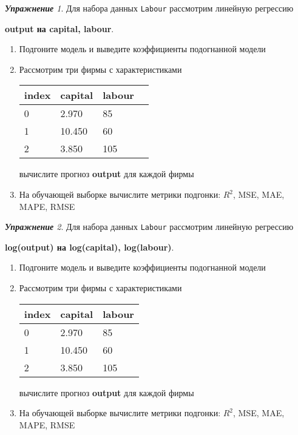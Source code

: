\documentclass[a4,12pt]{article}
\theoremstyle{remark}
\newtheorem{exercise}{\textbf{Упражнение}}[section]
\begin{document}
\begin{exercise}
Для набора данных \texttt{Labour} рассмотрим линейную регрессию 
\begin{center}
	\textbf{output на capital, labour}.
\end{center}
\begin{enumerate}
	\item Подгоните модель и выведите коэффициенты подогнанной модели
	\item Рассмотрим три фирмы с характеристиками
	\begin{center}
		\begin{tabular}{|l||l||l|l|}\hline
			index & capital & labour \\ \hline\hline
			0 & 2.970 & 85 \\
			1 & 10.450 & 60  \\
			2 & 3.850 & 105 \\ \hline
		\end{tabular}
	\end{center}
	вычислите прогноз \textbf{output} для каждой фирмы
	\item На обучающей выборке вычислите метрики подгонки: \(R^2\), 
	MSE, MAE, MAPE, RMSE
\end{enumerate}
\end{exercise}

\begin{exercise}
Для набора данных \texttt{Labour} рассмотрим линейную регрессию 
\begin{center}
	\textbf{log(output) на log(capital), log(labour)}.
\end{center}
\begin{enumerate}
	\item Подгоните модель и выведите коэффициенты подогнанной модели
	\item Рассмотрим три фирмы с характеристиками
	\begin{center}
		\begin{tabular}{|l||l|l|}\hline
			index & capital & labour \\ \hline\hline
			0 & 2.970 & 85 \\
			1 & 10.450 & 60  \\
			2 & 3.850 & 105 \\ \hline
		\end{tabular}
	\end{center}
	вычислите прогноз \textbf{output} для каждой фирмы
	\item На обучающей выборке вычислите метрики подгонки: \(R^2\), 
	MSE, MAE, MAPE, RMSE
\end{enumerate}
\end{exercise}
\end{document}
